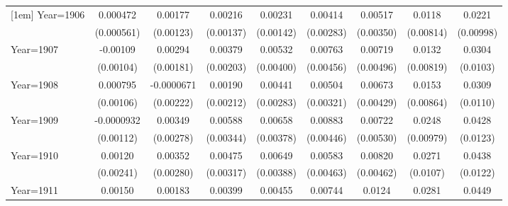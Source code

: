 \begin{table}[htbp]
\begin{tabular}{l*{8}{c}}
[1em]
Year=1906           &    0.000472         &     0.00177         &     0.00216         &     0.00231         &     0.00414         &     0.00517         &      0.0118         &      0.0221\sym{**} \\
                    &  (0.000561)         &   (0.00123)         &   (0.00137)         &   (0.00142)         &   (0.00283)         &   (0.00350)         &   (0.00814)         &   (0.00998)         \\
[1em]
Year=1907           &    -0.00109         &     0.00294         &     0.00379\sym{*}  &     0.00532         &     0.00763\sym{*}  &     0.00719         &      0.0132         &      0.0304\sym{***}\\
                    &   (0.00104)         &   (0.00181)         &   (0.00203)         &   (0.00400)         &   (0.00456)         &   (0.00496)         &   (0.00819)         &    (0.0103)         \\
[1em]
Year=1908           &    0.000795         &  -0.0000671         &     0.00190         &     0.00441         &     0.00504         &     0.00673         &      0.0153\sym{*}  &      0.0309\sym{***}\\
                    &   (0.00106)         &   (0.00222)         &   (0.00212)         &   (0.00283)         &   (0.00321)         &   (0.00429)         &   (0.00864)         &    (0.0110)         \\
[1em]
Year=1909           &  -0.0000932         &     0.00349         &     0.00588\sym{*}  &     0.00658\sym{*}  &     0.00883\sym{**} &     0.00722         &      0.0248\sym{**} &      0.0428\sym{***}\\
                    &   (0.00112)         &   (0.00278)         &   (0.00344)         &   (0.00378)         &   (0.00446)         &   (0.00530)         &   (0.00979)         &    (0.0123)         \\
[1em]
Year=1910           &     0.00120         &     0.00352         &     0.00475         &     0.00649\sym{*}  &     0.00583         &     0.00820\sym{*}  &      0.0271\sym{**} &      0.0438\sym{***}\\
                    &   (0.00241)         &   (0.00280)         &   (0.00317)         &   (0.00388)         &   (0.00463)         &   (0.00462)         &    (0.0107)         &    (0.0122)         \\
[1em]
Year=1911           &     0.00150         &     0.00183         &     0.00399         &     0.00455         &     0.00744\sym{**} &      0.0124\sym{*}  &      0.0281\sym{**} &      0.0449\sym{***}\\

\end{tabular}
\end{table}
